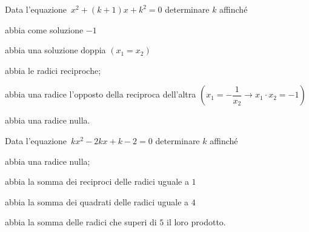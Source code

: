 \begin{flushright}
\end{flushright}


\begin{esercizio}[*]
\label{ese:3.101}
Data l'equazione~\(x^{2} + (k + 1) x + k^{2} = 0\) determinare \(k\) 
affinché
\begin{enumeratea}
\item abbia come soluzione \(-1\)
\item abbia una soluzione doppia \((x_1 =x_2)\)
\item abbia le radici reciproche;~
\item abbia una radice l'opposto della reciproca dell'altra 
\(\left(x_1=-\dfrac{1}{x_2}\rightarrow x_1 \cdot x_2=-1\right)\)
\item abbia una radice nulla.
\end{enumeratea}
\end{esercizio}

\begin{flushright}
\end{flushright}

\begin{esercizio}[*]
\label{ese:3.102}
Data l'equazione~\(kx^{2}-2kx + k-2 = 0\) determinare \(k\) affinché
\begin{enumeratea}
\item abbia una radice nulla;~
\item abbia la somma dei reciproci delle radici uguale a \(1\)
\item abbia la somma dei quadrati delle radici uguale a \(4\)
\item abbia la somma delle radici che superi di \(5\) il loro prodotto.
\end{enumeratea}
\end{esercizio}

\begin{flushright}
\end{flushright}


